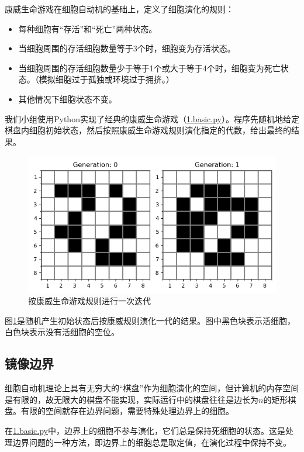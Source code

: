 \documentclass{ctexart}
\begin{document}
康威生命游戏在细胞自动机的基础上，定义了细胞演化的规则：

\begin{itemize}
  \item 每种细胞有“存活”和“死亡”两种状态。
  \item 当细胞周围的存活细胞数量等于3个时，细胞变为存活状态。
  \item 当细胞周围的存活细胞数量少于等于1个或大于等于4个时，细胞变为死亡状态。（模拟细胞过于孤独或环境过于拥挤。）
  \item 其他情况下细胞状态不变。
\end{itemize}

我们小组使用Python实现了经典的康威生命游戏（\underline{1.basic.py}）。程序先随机地给定棋盘内细胞初始状态，然后按照康威生命游戏规则演化指定的代数，给出最终的结果。

\begin{figure}[ht]
  \centering
  \includegraphics[scale=0.75]{cellular-automation.png}
  \caption{按康威生命游戏规则进行一次迭代}
  \label{fig:cellular-automation}
\end{figure}

图\ref{fig:cellular-automation}是随机产生初始状态后按康威规则演化一代的结果。图中黑色块表示活细胞，白色块表示没有活细胞的空位。

\subsection{镜像边界}

细胞自动机理论上具有无穷大的“棋盘”作为细胞演化的空间，但计算机的内存空间是有限的，故无限大的棋盘不能实现，实际运行中的棋盘往往是边长为$n$的矩形棋盘。有限的空间就存在边界问题，需要特殊处理边界上的细胞。

在\underline{1.basic.py}中，边界上的细胞不参与演化，它们总是保持死细胞的状态。这是处理边界问题的一种方法，即边界上的细胞总是取定值，在演化过程中保持不变。
\end{document}
